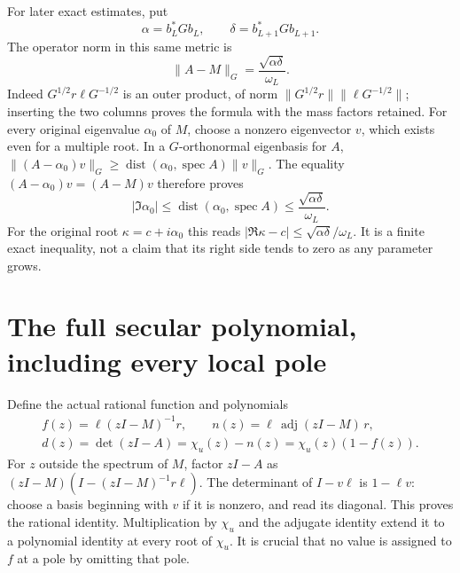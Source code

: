 For later exact estimates, put
\[
\alpha=b_L^*Gb_L,\qquad \delta=b_{L+1}^*Gb_{L+1}.
\]
The operator norm in this same metric is
\begin{equation}\tag{NS9}\label{sfsec:NS9}
\|A-M\|_G=\frac{\sqrt{\alpha\delta}}{\omega_L}.
\end{equation}
Indeed $G^{1/2}r\ell G^{-1/2}$ is an outer product, of norm
$\|G^{1/2}r\|\|\ell G^{-1/2}\|$; inserting the two columns
proves the formula with the mass factors retained.
For every original eigenvalue $\alpha_0$ of $M$, choose a
nonzero eigenvector $v$, which exists even for a multiple root.
In a $G$-orthonormal eigenbasis for $A$,
$\|(A-\alpha_0)v\|_G\geq
\operatorname{dist}(\alpha_0,\operatorname{spec}A)\|v\|_G$.
The equality $(A-\alpha_0)v=(A-M)v$ therefore proves
\begin{equation}\tag{NS10}\label{sfsec:NS10}
|\Im\alpha_0|
\leq\operatorname{dist}(\alpha_0,\operatorname{spec}A)
\leq\frac{\sqrt{\alpha\delta}}{\omega_L}.
\end{equation}
For the original root $\kappa=c+i\alpha_0$ this reads
$|\Re\kappa-c|\leq\sqrt{\alpha\delta}/\omega_L$.
It is a finite exact inequality, not a claim that its right
side tends to zero as any parameter grows.

\section{The full secular polynomial, including every local pole}

Define the actual rational function and polynomials
\begin{equation}\tag{NS11}\label{sfsec:NS11}
\begin{gathered}
f(z)=\ell(zI-M)^{-1}r,\qquad
n(z)=\ell\,\operatorname{adj}(zI-M)\,r,\\
d(z)=\det(zI-A)
=\chi_u(z)-n(z)
=\chi_u(z)(1-f(z)).
\end{gathered}
\end{equation}
For $z$ outside the spectrum of $M$, factor $zI-A$ as
$(zI-M)(I-(zI-M)^{-1}r\ell)$. The determinant of $I-v\ell$
is $1-\ell v$: choose a basis beginning with $v$ if it is
nonzero, and read its diagonal. This proves the rational
identity. Multiplication by $\chi_u$ and the adjugate
identity extend it to a polynomial identity at every root
of $\chi_u$. It is crucial that no value is assigned to
$f$ at a pole by omitting that pole.

